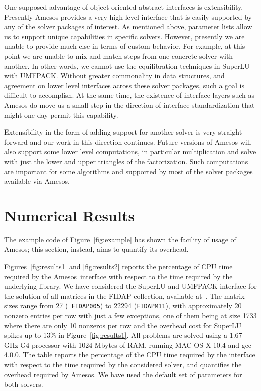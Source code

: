 \documentclass[acmtoms,acmnow]{acmtrans2m}
\newcommand{\amesos}{{\sc Amesos}}
\begin{document}
One supposed advantage of object-oriented abstract interfaces is
extensibility.  Presently Amesos provides a very high level
interface that is easily supported by any of the solver packages of
interest.  As mentioned above, parameter lists allow us to support
unique capabilities in specific solvers.  However, presently we are
unable to provide much else in terms of custom behavior.  For
example, at this point we are unable to mix-and-match steps from one
concrete solver with another. In other words, we cannot use the
equilibration techniques in SuperLU with UMFPACK. Without greater
commonality in data structures, and agreement on lower level
interfaces across these solver packages, such a goal is difficult to
accomplish.  At the same time, the existence of interface layers
such as Amesos do move us a small step in the direction of interface
standardization that might one day permit this capability.

Extensibility in the form of adding support for another solver is
very straight-forward and our work in this direction continues.
Future versions of Amesos will also support some lower level
computations, in particular multiplication and solve with just the
lower and upper triangles of the factorization.  Such computations
are important for some algorithms and supported by most of the
solver packages available via Amesos.

\section{Numerical Results}
\label{sec:numerical}

The example code of Figure~\ref{fig:example} has shown the facility of usage
of \amesos; this section, instead, aims to quantify its overhead.

Figures~\ref{fig:results1} and \ref{fig:results2} reports the
percentage of CPU time required by the \amesos\ interface with
respect to the time required by the underlying library. We have
considered the SuperLU and UMFPACK interface for the solution of all
matrices in the FIDAP collection, available
at~\cite{boisvert97matrix}. The matrix sizes range from 27 ({\tt
FIDAP005}) to 22294 ({\tt FIDAPM11}), with approximately 20 nonzero
entries per row with just a few exceptions, one of them being at
size 1733 where there are only 10 nonzeros per row and the overhead
cost for SuperLU spikes up to 13\% in Figure~\ref{fig:results1}. All
problems are solved using a 1.67 GHz G4 processor with 1024 Mbytes
of RAM, running MAC OS X 10.4 and gcc 4.0.0. The table reports the
percentage of the CPU time required by the interface with respect to
the time required by the considered solver, and quantifies the
overhead required by \amesos. We have used the default set of
parameters for both solvers.
\end{document}
